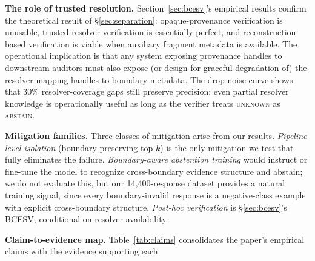 \documentclass[conference,compsoc]{IEEEtran}
\begin{document}
\textbf{The role of trusted resolution.}
Section~\ref{sec:bcesv}'s empirical results confirm the theoretical result of \S\ref{sec:separation}: opaque-provenance verification is unusable, trusted-resolver verification is essentially perfect, and reconstruction-based verification is viable when auxiliary fragment metadata is available. The operational implication is that any system exposing provenance handles to downstream auditors must also expose (or design for graceful degradation of) the resolver mapping handles to boundary metadata. The drop-noise curve shows that 30\% resolver-coverage gaps still preserve precision: even partial resolver knowledge is operationally useful as long as the verifier treats \textsc{unknown} as \textsc{abstain}.

\textbf{Mitigation families.}
Three classes of mitigation arise from our results. \emph{Pipeline-level isolation} (boundary-preserving top-$k$) is the only mitigation we test that fully eliminates the failure. \emph{Boundary-aware abstention training} would instruct or fine-tune the model to recognize cross-boundary evidence structure and abstain; we do not evaluate this, but our 14{,}400-response dataset provides a natural training signal, since every boundary-invalid response is a negative-class example with explicit cross-boundary structure. \emph{Post-hoc verification} is \S\ref{sec:bcesv}'s BCESV, conditional on resolver availability.

\textbf{Claim-to-evidence map.}
Table~\ref{tab:claims} consolidates the paper's empirical claims with the evidence supporting each.
\end{document}
